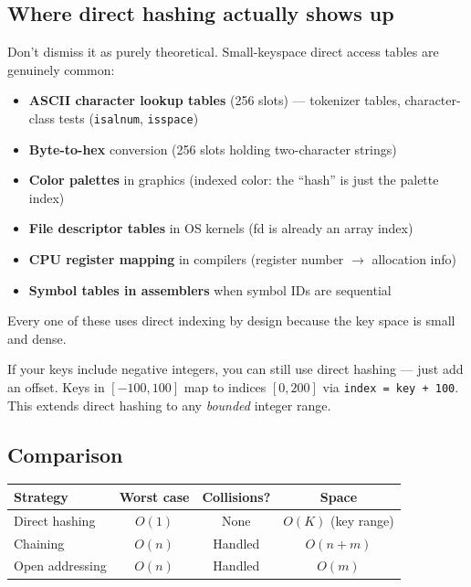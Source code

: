 \documentclass[11pt]{article}
\begin{document}
\subsection*{Where direct hashing actually shows up}

Don't dismiss it as purely theoretical. Small-keyspace direct
access tables are genuinely common:

\begin{itemize}[leftmargin=*]
    \item \textbf{ASCII character lookup tables} (256 slots) ---
          tokenizer tables, character-class tests
          (\texttt{isalnum}, \texttt{isspace})
    \item \textbf{Byte-to-hex} conversion (256 slots holding
          two-character strings)
    \item \textbf{Color palettes} in graphics (indexed color:
          the ``hash'' is just the palette index)
    \item \textbf{File descriptor tables} in OS kernels (fd is
          already an array index)
    \item \textbf{CPU register mapping} in compilers
          (register number $\to$ allocation info)
    \item \textbf{Symbol tables in assemblers} when symbol IDs
          are sequential
\end{itemize}

Every one of these uses direct indexing by design because the
key space is small and dense.

\begin{warnbox}
If your keys include negative integers, you can still use direct
hashing --- just add an offset. Keys in $[-100, 100]$ map to
indices $[0, 200]$ via \texttt{index = key + 100}. This extends
direct hashing to any \emph{bounded} integer range.
\end{warnbox}

\subsection*{Comparison}

\begin{center}
\begin{tabular}{|l|c|c|c|}
\hline
\textbf{Strategy} & \textbf{Worst case} & \textbf{Collisions?} & \textbf{Space} \\
\hline
Direct hashing    & $O(1)$ & None       & $O(K)$ (key range) \\
Chaining          & $O(n)$ & Handled    & $O(n + m)$ \\
Open addressing   & $O(n)$ & Handled    & $O(m)$ \\
\hline
\end{tabular}
\end{center}
\end{document}
